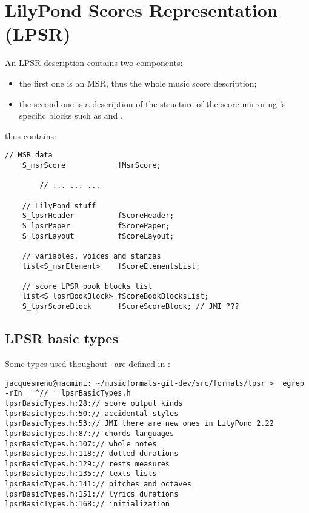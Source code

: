 
\chapter{LilyPond Scores Representation (LPSR)}


An LPSR description contains two components:
\begin{itemize}
\item the first one is an MSR, thus the whole music score description;
\item the second one is a description of the structure of the score mirroring \lily's specific blocks such as  and .
\end{itemize}

 thus contains:
\begin{lstlisting}[language=CPlusPlus]
    // MSR data
    S_msrScore            fMsrScore;

		// ... ... ...

    // LilyPond stuff
    S_lpsrHeader          fScoreHeader;
    S_lpsrPaper           fScorePaper;
    S_lpsrLayout          fScoreLayout;

    // variables, voices and stanzas
    list<S_msrElement>    fScoreElementsList;

    // score LPSR book blocks list
    list<S_lpsrBookBlock> fScoreBookBlocksList;
    S_lpsrScoreBlock      fScoreScoreBlock; // JMI ???
\end{lstlisting}

\section{LPSR basic types}\label{LPSR basic types}

Some types used thoughout \lpsrRepr\ are defined in :%
\begin{lstlisting}[language=Terminal]
jacquesmenu@macmini: ~/musicformats-git-dev/src/formats/lpsr >  egrep -rIn  '^// ' lpsrBasicTypes.h
lpsrBasicTypes.h:28:// score output kinds
lpsrBasicTypes.h:50:// accidental styles
lpsrBasicTypes.h:53:// JMI there are new ones in LilyPond 2.22
lpsrBasicTypes.h:87:// chords languages
lpsrBasicTypes.h:107:// whole notes
lpsrBasicTypes.h:118:// dotted durations
lpsrBasicTypes.h:129:// rests measures
lpsrBasicTypes.h:135:// texts lists
lpsrBasicTypes.h:141:// pitches and octaves
lpsrBasicTypes.h:151:// lyrics durations
lpsrBasicTypes.h:168:// initialization
\end{lstlisting}


